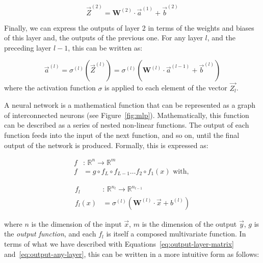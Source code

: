 \begin{equation}
    \label{eq:output-layer-matrix}
    \Vec{Z}^{(2)} = \mathbf{W}^{(2)}\cdot \Vec{a}^{(1)} + \Vec{b}^{(2)}
\end{equation}

Finally, we can express the outputs of layer 2 in terms of the weights and biases of this layer and, the outputs of the previous one. For any layer $l$, and the preceding layer $l-1$, this can be written as:

\begin{equation}
\label{eq:output-any-layer}
\Vec{a}^{(l)} = \sigma^{(l)}\left(\Vec{Z}^{(l)}\right) = \sigma^{(l)}\left(\mathbf{W}^{(l)} \cdot \Vec{a}^{(l-1)} + \Vec{b}^{(l)}\right)
\end{equation}
where the activation function $\sigma$ is applied to each element of the vector $\Vec{Z_l}$.

A neural network is a mathematical function that can be represented as a graph of interconnected neurons (see Figure~\ref{fig:mlp}). Mathematically, this function can be described as a series of nested non-linear functions. The output of each function feeds into the input of the next function, and so on, until the final output of the network is produced. Formally, this is expressed as:

\begin{align}
f &\text{: } \mathbb{R}^n \to \mathbb{R}^m\nonumber\\
f &= g \circ f_L \circ f_{L-1} \dots f_2 \circ f_1 (x) \text{ with, }
\end{align}

\begin{align}
f_l &\text{: } \mathbb{R}^{n_l} \to \mathbb{R}^{n_{l-1}}\nonumber\\
f_l(x) &= \sigma^{(l)}(\mathbf{W}^{(l)} \cdot \Vec{x} + b^{(l)})
\end{align}

where $n$ is the dimension of the input $\Vec{x}$, $m$ is the dimension of the output $\Vec{y}$, $g$ is the \emph{output function}, and each $f_l$ is itself a composed multivariate function. In terms of what we have described with Equations~\eqref{eq:output-layer-matrix} and~\eqref{eq:output-any-layer}, this can be written in a more intuitive form as follows:

